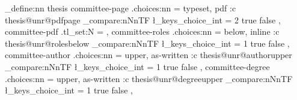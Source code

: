 \newif\ifthesis@unr@degreeupper  \thesis@unr@degreeuppertrue
\newcommand{\thesis@unr@pdf}{}
\ExplSyntaxOn
\keys_define:nn { thesis }
	{
		committee-page .choices:nn = { typeset, pdf }
			{ \use:c { thesis@unr@pdfpage \int_compare:nNnTF \l_keys_choice_int = 2 { true } { false } } } ,
		committee-pdf .tl_set:N = \thesis@unr@pdf ,
		committee-roles .choices:nn = { below, inline }
			{ \use:c { thesis@unr@rolesbelow \int_compare:nNnTF \l_keys_choice_int = 1 { true } { false } } } ,
		committee-author .choices:nn = { upper, as-written }
			{ \use:c { thesis@unr@authorupper \int_compare:nNnTF \l_keys_choice_int = 1 { true } { false } } } ,
		committee-degree .choices:nn = { upper, as-written }
			{ \use:c { thesis@unr@degreeupper \int_compare:nNnTF \l_keys_choice_int = 1 { true } { false } } } ,
	}
\ExplSyntaxOff

\newcommand{\thesis@unr@upper}[2]{%
	#1{\MakeUppercase{#2}}\else{#2}\fi}

\newcommand{\thesis@unr@memberline}[2]{%
	\par\vskip 0.45\baselineskip
	\ifthesis@unr@rolesbelow
		#1\par
		\ifx\relax#2\relax\else{\itshape #2}\par\fi
	\else
		#1\ifx\relax#2\relax\else, #2\fi\par
	\fi
}

